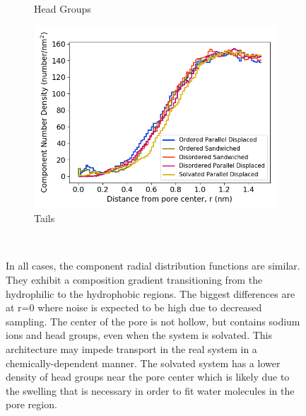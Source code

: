 \documentclass[journal=jpcbfk,manuscript=article]{achemso}
\begin{document}
\begin{figure}[!htb]
\begin{subfigure}{0.32\textwidth}
        \caption{Head Groups}
        \label{fig:head_groups_regional_density}
  \end{subfigure}
  \begin{subfigure}{0.32\textwidth}
        \includegraphics[width=1\linewidth]{tails_density.png}
        \caption{Tails}
        \label{fig:tails_regional_density}
  \end{subfigure}
  \caption{In all cases, the component radial distribution functions are similar. 
      They exhibit a composition gradient transitioning from the hydrophilic to the hydrophobic
	  regions. The biggest differences are at r=0 where noise is expected to be high due to 
	  decreased sampling. The center of the pore is not hollow, but contains sodium ions and 
	  head groups, even when the system is solvated. This architecture may impede transport in 
	  the real system in a chemically-dependent manner. 
          The solvated system has a lower density of head groups near the 
	  pore center which is likely due to the swelling that is necessary in order to fit water
	  molecules in the pore region.}~\label{fig:overlaid_densities}
  \end{figure}
\end{document}
